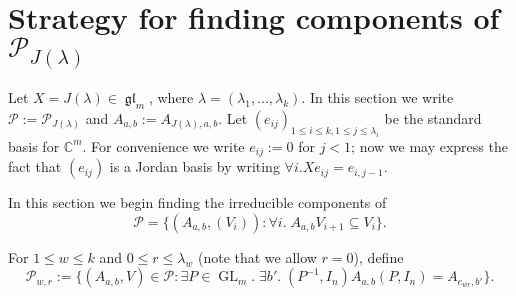 \documentclass[12pt,psamsfonts]{article}
\DeclareMathOperator{\GL}{GL}
\DeclareMathOperator{\gl}{\mathfrak{gl}}
\begin{document}
\section{Strategy for finding components of \texorpdfstring{\(\mathcal{P}_{J(\lambda)}\)}{P\_\{J(\textbackslash lambda)\}}}
\par Let \(X = J(\lambda) \in \gl_m\), where \(\lambda = (\lambda_1, ..., \lambda_k)\).
In this section we write \(\mathcal{P} := \mathcal{P}_{J(\lambda)}\) and \(A_{a, b} := A_{J(\lambda), a, b}\).
Let \((e_{ij})_{1 \leq i \leq k, 1 \leq j \leq \lambda_i}\) be the standard basis for \(\mathbb{C}^m\).
For convenience we write \(e_{ij} := 0\) for \(j < 1\); now we may express the fact that \((e_{ij})\) is a Jordan basis by writing \(\forall i. Xe_{ij} = e_{i,j - 1}\).
\par In this section we begin finding the irreducible components of
\[\mathcal{P} = \{(A_{a, b}, (V_i)) : \forall i. \; A_{a, b} V_{i + 1} \subseteq V_i\}.\]
\par For \(1 \leq w \leq k\) and \(0 \leq r \leq \lambda_w\) (note that we allow \(r = 0\)), define 
\[\mathcal{P}_{w,r} := \{(A_{a, b}, V) \in \mathcal{P} : \exists P \in \GL_{m}. \; \exists b'. \; (P^{-1}, I_n) A_{a, b} (P, I_n) = A_{e_{wr}, b'} \}.\]
\end{document}
